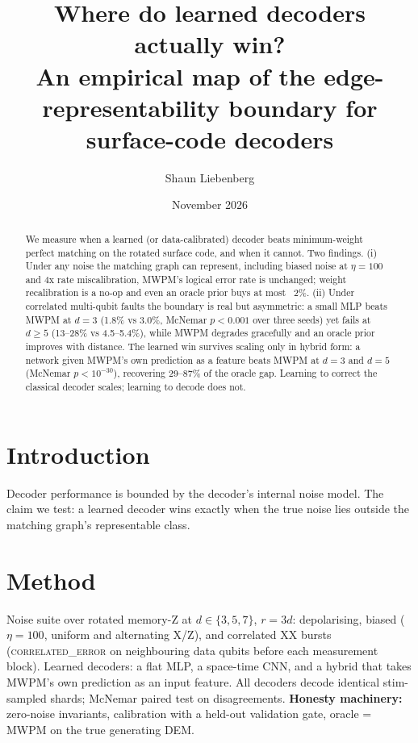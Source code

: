 \documentclass[11pt]{article}
\title{Where do learned decoders actually win?\\
An empirical map of the edge-representability boundary for
surface-code decoders}
\author{Shaun Liebenberg}
\date{November 2026}
\begin{document}
\maketitle

\begin{abstract}
We measure when a learned (or data-calibrated) decoder beats
minimum-weight perfect matching on the rotated surface code, and when it
cannot. Two findings. (i) Under any noise the matching graph can
represent, including biased noise at $\eta{=}100$ and 4x rate
miscalibration, MWPM's logical error rate is unchanged; weight
recalibration is a no-op and even an oracle prior buys at most ~2\%.
(ii) Under correlated multi-qubit faults the boundary is real but
asymmetric: a small MLP beats MWPM at $d{=}3$ (1.8\% vs 3.0\%,
McNemar $p{<}0.001$ over three seeds) yet fails at $d{\geq}5$ (13--28\%
vs 4.5--5.4\%), while MWPM degrades gracefully and an oracle prior
improves with distance. The learned win survives scaling only in hybrid
form: a network given MWPM's own prediction as a feature beats MWPM at
$d{=}3$ and $d{=}5$ (McNemar $p{<}10^{-30}$), recovering 29--87\% of
the oracle gap. Learning to correct the classical decoder scales;
learning to decode does not.
\end{abstract}

\section{Introduction}
Decoder performance is bounded by the decoder's internal noise model.
The claim we test: a learned decoder wins exactly when the true noise
lies outside the matching graph's representable class.


\section{Method}
Noise suite over rotated memory-Z at $d\in\{3,5,7\}$, $r{=}3d$:
depolarising, biased ($\eta{=}100$, uniform and alternating X/Z), and
correlated XX bursts (\textsc{correlated\_error} on neighbouring data
qubits before each measurement block). Learned decoders: a flat MLP, a
space-time CNN, and a hybrid that takes MWPM's own prediction as an
input feature. All decoders decode identical stim-sampled shards;
McNemar paired test on disagreements.
\textbf{Honesty machinery:} zero-noise invariants, calibration with a
held-out validation gate, oracle = MWPM on the true generating DEM.
\end{document}
